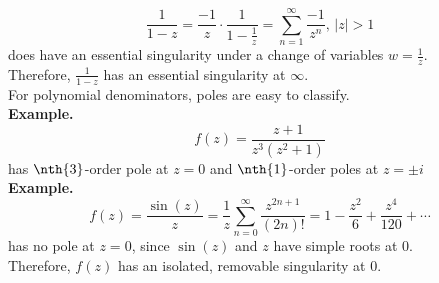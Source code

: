\documentclass[11pt]{article}
\begin{document}
$$ \frac{1}{1 - z} = \frac{-1}{z}\cdot \frac{1}{1 - \frac{1}{z}} = \sum_{n = 1}^{\infty} \frac{-1}{z^n}, \, |z| > 1$$
does have an essential singularity under a change of variables $w = \frac{1}{z}$. \\
Therefore, $\frac{1}{1-z}$ has an essential singularity at $\infty$. \\
\newline
For polynomial denominators, poles are easy to classify. \\
\textbf{Example.} 
$$ f(z) = \frac{z + 1}{z^3(z^2 + 1)}$$
has $\nth{3}$-order pole at $z = 0$ and $\nth{1}$-order poles at $z = \pm i$ \\
\newline
\textbf{Example.} 
$$ f(z) = \frac{\sin(z)}{z} = \frac{1}{z}\sum_{n = 0}^{\infty}\frac{z^{2n + 1}}{(2n)!} = 1 - \frac{z^2}{6} + \frac{z^4}{120} + \cdots$$
has no pole at $z = 0$, since $\sin(z)$ and $z$ have simple roots at 0. \\
Therefore, $f(z)$ has an isolated, removable singularity at 0.
\newpage
\end{document}
